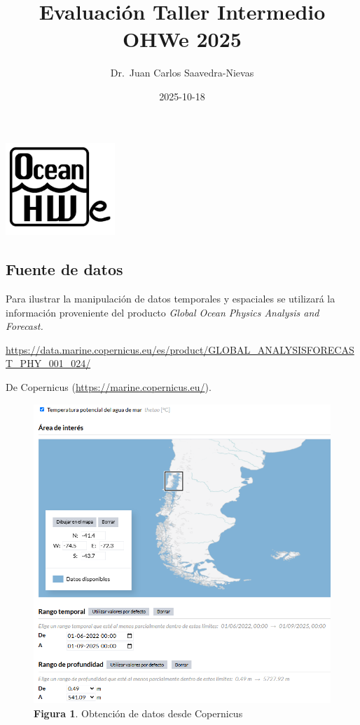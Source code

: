 \documentclass[
]{article}
\title{Evaluación Taller Intermedio OHWe 2025}
\author{Dr.~Juan Carlos Saavedra-Nievas}
\date{2025-10-18}
\renewcommand*\contentsname{Table of contents}
\newcommand\contentsname{Table of contents}
\begin{document}
\maketitle

\renewcommand*\contentsname{Table of contents}
{
\hypersetup{linkcolor=}
\setcounter{tocdepth}{3}
\tableofcontents
}
\begin{center}
\includegraphics[width=1.625in,height=\textheight]{OHWe.png}
\end{center}

\subsection{Fuente de datos}\label{fuente-de-datos}

Para ilustrar la manipulación de datos temporales y espaciales se
utilizará la información proveniente del producto \emph{Global Ocean
Physics Analysis and Forecast.}

\url{https://data.marine.copernicus.eu/es/product/GLOBAL_ANALYSISFORECAST_PHY_001_024/}

De Copernicus (\url{https://marine.copernicus.eu/}).

\begin{figure}[H]

{\centering \includegraphics[width=6.77083in,height=\textheight]{DataCopernicus.png}

}

\caption{\textbf{Figura 1}. Obtención de datos desde Copernicus}

\end{figure}%
\end{document}

